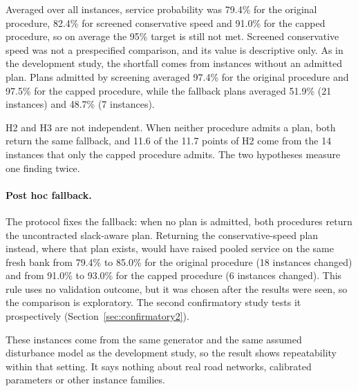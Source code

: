 Averaged over all instances, service probability was 79.4\% for the original procedure, 82.4\% for screened conservative speed and 91.0\% for the capped procedure, so on average the 95\% target is still not met. Screened conservative speed was not a prespecified comparison, and its value is descriptive only. As in the development study, the shortfall comes from instances without an admitted plan. Plans admitted by screening averaged 97.4\% for the original procedure and 97.5\% for the capped procedure, while the fallback plans averaged 51.9\% (21 instances) and 48.7\% (7 instances).

H2 and H3 are not independent. When neither procedure admits a plan, both return the same fallback, and 11.6 of the 11.7 points of H2 come from the 14 instances that only the capped procedure admits. The two hypotheses measure one finding twice.

\paragraph{Post hoc fallback.} The protocol fixes the fallback: when no plan is admitted, both procedures return the uncontracted slack-aware plan. Returning the conservative-speed plan instead, where that plan exists, would have raised pooled service on the same fresh bank from 79.4\% to 85.0\% for the original procedure (18 instances changed) and from 91.0\% to 93.0\% for the capped procedure (6 instances changed). This rule uses no validation outcome, but it was chosen after the results were seen, so the comparison is exploratory. The second confirmatory study tests it prospectively (Section~\ref{sec:confirmatory2}).

These instances come from the same generator and the same assumed disturbance model as the development study, so the result shows repeatability within that setting. It says nothing about real road networks, calibrated parameters or other instance families.
